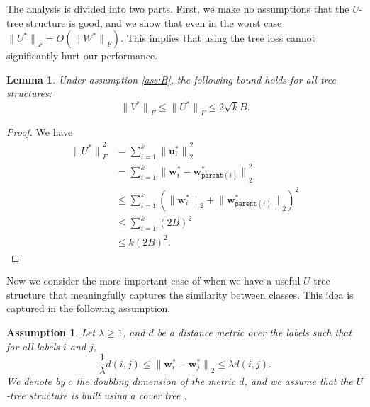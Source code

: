 \documentclass[twoside]{article}
\newtheorem{assumption}{Assumption}
\newtheorem{lemma}{Lemma}
\newcommand{\parent}[1]{\texttt{parent}({#1})}
\renewcommand{\star}[1]{{#1}^{*}}
\newcommand{\uu}{\mathbf u}
\newcommand{\w}{\mathbf w}
\newcommand{\ltwo}[1]{{\lVert {#1} \rVert}_2}
\newcommand{\lF}[1]{{\lVert {#1} \rVert}_F}
\begin{document}
The analysis is divided into two parts.
First, we make no assumptions that the $U$-tree structure is good,
and we show that even in the worst case $\lF{\star U} = O(\lF{\star W})$.
This implies that using the tree loss cannot significantly hurt our performance.
\begin{lemma}
    \label{lemma:starU}
    Under assumption \ref{ass:B},
    the following bound holds for all tree structures:
    \begin{equation}
        \lF{\star V} \le \lF{\star U} \le 2\sqrt{k}B.
    \end{equation}
\end{lemma}
\begin{proof}
    We have
    \begin{align}
        \lF{\star U}^2 
        &= \sum_{i=1}^k \ltwo{\star\uu_i}^2 \\
        &= \sum_{i=1}^k \ltwo{\star\w_i - \star\w_{\parent{i}}}^2 \\
        &\le \sum_{i=1}^k \left(\ltwo{\star\w_i} + \ltwo{\star\w_{\parent{i}}} \right)^2 \\
        &\le \sum_{i=1}^k (2B)^2 \\
        &\le k (2B)^2
        .
    \end{align}
\end{proof}
Now we consider the more important case of when we have a useful $U$-tree structure that meaningfully captures the similarity between classes.
This idea is captured in the following assumption.
\begin{assumption}
    \label{ass:metric}
    Let $\lambda \ge 1$, and $d$ be a distance metric over the labels such that for all labels $i$ and $j$,
\begin{equation}
    \frac 1 \lambda d(i,j)
    \le \ltwo{\star \w_i - \star \w_j}
    \le \lambda d(i, j).
\end{equation}
We denote by $c$ the doubling dimension of the metric $d$,
and we assume that the $U$-tree structure is built using a cover tree \citep{beygelzimer2006cover}.
\end{assumption}
\end{document}

